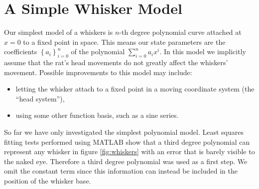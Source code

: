 \section*{A Simple Whisker Model}

Our simplest model of a whiskers is $n$-th degree polynomial curve attached at $x=0$ to a fixed point in space. This means our state parameters are the coefficients $\left\{a_i\right\}_{i=0}^n$ of the polynomial $\sum_{i=0}^n a_ix^i$. In this model we implicitly assume that the rat's head movements do not greatly affect the whiskers' movement. Possible improvements to this model may include:
\begin{itemize}
  \item letting the whisker attach to a fixed point in a moving coordinate system (the ``head system''),
  \item using some other function basis, such as a sine series.
\end{itemize}

So far we have only investigated the simplest polynomial model. Least squares fitting tests performed using MATLAB show that a third degree polynomial can represent any whisker in figure \ref{fig:whiskers} with an error that is barely visible to the naked eye. Therefore a third degree polynomial was used as a first step. We omit the constant term since this information can instead be included in the position of the whisker base.


